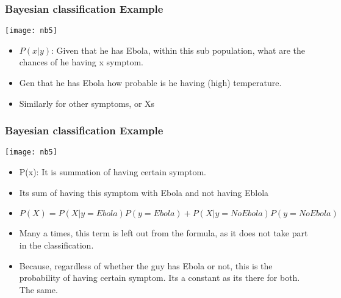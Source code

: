 \begin{frame}[fragile]\frametitle{Bayesian classification Example}
\begin{center}
\texttt{[image: nb5]}
\end{center}
\begin{itemize}
\item $P(x|y)$: Given that he has Ebola, within this sub population, what are the chances of he having x symptom.
\item Gen that he has Ebola how probable is he having (high) temperature. 
\item Similarly for other symptoms, or Xs
\end{itemize}
\end{frame}

\begin{frame}[fragile]\frametitle{Bayesian classification Example}
\begin{center}
\texttt{[image: nb5]}
\end{center}
\begin{itemize}
\item P(x): It is summation of having certain symptom.
\item Its sum of having this symptom with Ebola and not having Eblola
\item $P(X) = P(X|y=Ebola)P(y=Ebola) + P(X|y=NoEbola)P(y=NoEbola)$ 
\item Many a times, this term is left out from the formula, as it does not take part in the classification.
\item Because, regardless of whether the guy has Ebola or not, this is the probability of having certain symptom. Its a constant as its there for both. The same.
\end{itemize}
\end{frame}

